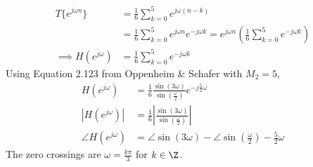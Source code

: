 \documentclass{article}
\begin{document}
\begin{align}
    T\{e^{j \omega n}\} &= \frac{1}{6} \sum_{k = 0}^5 e^{j \omega (n - k)} \\
    &= \frac{1}{6} \sum_{k = 0}^5 e^{j \omega n} e^{-j \omega k} = e^{j \omega n} \left(\frac{1}{6} \sum_{k = 0}^5 e^{-j \omega k}\right) \\
    \implies H(e^{j \omega}) &= \frac{1}{6} \sum_{k = 0}^5 e^{-j \omega k}
\end{align}
Using Equation 2.123 from Oppenheim \& Schafer with \(M_2 = 5\),
\begin{align}
    H(e^{j \omega}) &= \frac{1}{6} \frac{\sin(3\omega)}{\sin\left(\frac{\omega}{2}\right)} e^{-j \frac{5}{2} \omega} \\
    |H(e^{j \omega})| &= \frac{1}{6} \left|\frac{\sin(3\omega)}{\sin\left(\frac{\omega}{2}\right)}\right| \\
    \angle H(e^{j \omega}) &= \angle \sin(3 \omega) - \angle \sin\left(\frac{\omega}{2}\right) - \frac{5}{2} \omega
\end{align}
The zero crossings are \(\omega = \frac{k\pi}{3}\) for \(k \in \Z\).
\begin{center}
\end{center}
\end{document}
